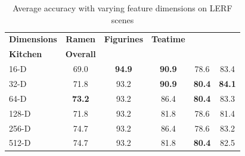 \begin{table}[t]
    \centering
    \footnotesize
    \begin{tabular}{lccccc}
        \toprule
        \textbf{Dimensions}& 
        \hspace{-2pt}\textbf{Ramen}\hspace{-2pt} & \hspace{-2pt}\textbf{Figurines}\hspace{-2pt} & \hspace{-2pt}\textbf{Teatime}\hspace{-2pt} & \hspace{-2pt}\makecell{\textbf{Waldo}\\\textbf{Kitchen}}\hspace{-2pt} & \hspace{-2pt}\textbf{Overall}\hspace{-2pt} \\
        \midrule
        16-D & 69.0 & \textbf{94.9} & \textbf{90.9} & 78.6 & 83.4 \\
        32-D & 71.8 & 93.2 & \textbf{90.9} & \textbf{80.4} & \textbf{84.1} \\
        64-D & \textbf{73.2} & 93.2  & 86.4 & \textbf{80.4} & 83.3 \\
        128-D & 71.8 & 93.2  & 81.8 & 78.6 & 81.4 \\
        256-D & 74.7 & 93.2  & 86.4 & 78.6 & 83.2 \\
        512-D & 74.7 & 93.2  & 81.8 & \textbf{80.4} & 82.5 \\
        \bottomrule
    \end{tabular}
    \caption{Average accuracy with varying feature dimensions on LERF scenes}
    \label{tab:lerf-featdim-acc}
\end{table}